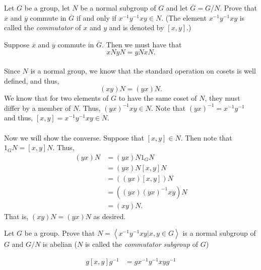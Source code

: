 \documentclass[12 pt, letterpaper]{hmcpset}
\begin{document}
\begin{problem}
	Let $G$ be a group, let $N$ be a normal subgroup of $G$ and let $\overline{G} = G/N$. Prove that $\overline{x}$ and $\overline{y}$ commute in $\overline{G}$ if and only if $x^{-1}y^{-1}xy \in N$. (The element $x^{-1}y^{-1}xy$ is called the \textit{commutator} of $x$ and $y$ and is denoted by $[x, y]$.)
\end{problem}

\begin{solution}
	Suppose $\overline{x}$ and $\overline{y}$ commute in $\overline{G}$. Then we must have that
	\[
		x N y N = y N x N.
	\] \\
	Since $N$ is a normal group, we know that the standard operation on cosets is well defined, and thus,
	\[
		(xy) N = (yx) N.
	\]
	We know that for two elements of $G$ to have the same coset of $N$, they must differ by a member of $N$. Thus, $(yx)^{-1}xy \in N$. Note that $(yx)^{-1} = x^{-1} y^{-1}$ and thus, $[x, y] = x^{-1}y^{-1}xy \in N$. \\\\
	Now we will show the converse. Suppose that $[x, y] \in N$. Then note that $1_{G} N = [x, y] N$. Thus,
	\[
		\begin{split}
			(yx) N & = (yx) N 1_{G} N \\
			       & = (yx) N [x, y] N \\
			       & = ((yx)[x, y]) N \\
			       & = ((yx)(yx)^{-1}xy) N \\
			       & = (xy) N.
		\end{split}
	\]
	That is, $(xy) N = (yx) N$ as desired.
\end{solution}

\pagebreak

\begin{problem}
	Let $G$ be a group. Prove that $N = \left < x^{-1}y^{-1}xy | x, y \in G \right >$ is a normal subgroup of $G$ and $G/N$ is abelian ($N$ is called the \textit{commutator subgroup} of $G$)
\end{problem}

\begin{solution}
	\[
		\begin{split}
			g [x, y] g^{-1} & = g x^{-1} y^{-1} x y g^{-1} \\
		\end{split}
	\]
\end{solution}

\pagebreak
\end{document}

